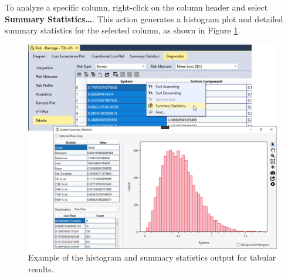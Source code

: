 \documentclass[
]{book}
\begin{document}
To analyze a specific column, right-click on the column header and select \textbf{Summary Statistics\ldots{}}. This action generates a histogram plot and detailed summary statistics for the selected column, as shown in Figure \ref{fig:figure-154}.

\begin{figure}

{\centering \includegraphics{images/figure154} 

}

\caption{Example of the histogram and summary statistics output for tabular results.}\label{fig:figure-154}
\end{figure}

  
\end{document}
